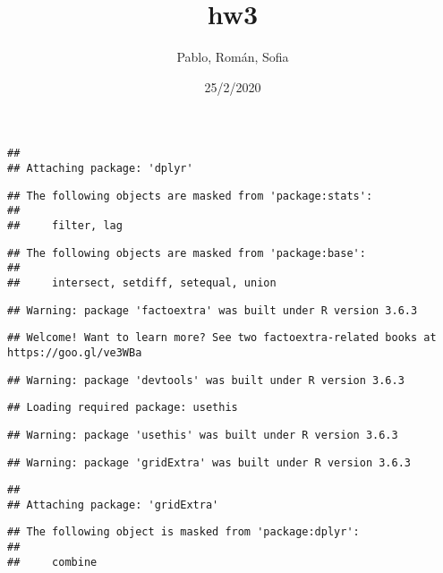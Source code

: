 \documentclass[]{article}
\title{hw3}
\author{Pablo, Román, Sofia}
\date{25/2/2020}
\begin{document}
\maketitle

\begin{verbatim}
## 
## Attaching package: 'dplyr'
\end{verbatim}

\begin{verbatim}
## The following objects are masked from 'package:stats':
## 
##     filter, lag
\end{verbatim}

\begin{verbatim}
## The following objects are masked from 'package:base':
## 
##     intersect, setdiff, setequal, union
\end{verbatim}

\begin{verbatim}
## Warning: package 'factoextra' was built under R version 3.6.3
\end{verbatim}

\begin{verbatim}
## Welcome! Want to learn more? See two factoextra-related books at https://goo.gl/ve3WBa
\end{verbatim}

\begin{verbatim}
## Warning: package 'devtools' was built under R version 3.6.3
\end{verbatim}

\begin{verbatim}
## Loading required package: usethis
\end{verbatim}

\begin{verbatim}
## Warning: package 'usethis' was built under R version 3.6.3
\end{verbatim}

\begin{verbatim}
## Warning: package 'gridExtra' was built under R version 3.6.3
\end{verbatim}

\begin{verbatim}
## 
## Attaching package: 'gridExtra'
\end{verbatim}

\begin{verbatim}
## The following object is masked from 'package:dplyr':
## 
##     combine
\end{verbatim}
\end{document}
